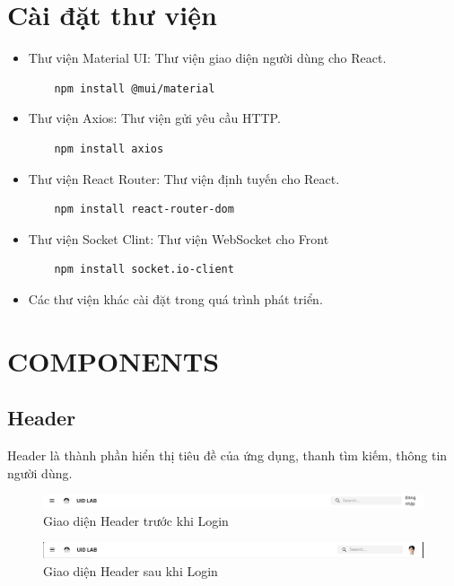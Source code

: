     \section{Cài đặt thư viện}
        \begin{itemize}
            \item Thư viện Material UI: Thư viện giao diện người dùng cho React.
            \begin{lstlisting}
    npm install @mui/material
            \end{lstlisting} 
            \item Thư viện Axios: Thư viện gửi yêu cầu HTTP.
            \begin{lstlisting}
    npm install axios
            \end{lstlisting} 
            \item Thư viện React Router: Thư viện định tuyến cho React.
            \begin{lstlisting}
    npm install react-router-dom
            \end{lstlisting}
            \item Thư viện Socket Clint: Thư viện WebSocket cho Front
            \begin{lstlisting}
    npm install socket.io-client
            \end{lstlisting}
            \item Các thư viện khác cài đặt trong quá trình phát triển.
        \end{itemize}
    \section{COMPONENTS}
        \subsection{Header}
            \hspace*{0.6cm}Header là thành phần hiển thị tiêu đề của ứng dụng, thanh tìm kiếm, thông tin người dùng.
            \begin{figure}[H]
                \centering
                \includegraphics[width=1\textwidth]{pictures/Header_1.png}
                \caption{Giao diện Header trước khi Login}
                \label{fig:header}
            \end{figure}
            \begin{figure}[H]
                \centering
                \includegraphics[width=1\textwidth]{pictures/Header_2.png}
                \caption{Giao diện Header sau khi Login}
                \label{fig:header}
            \end{figure}
